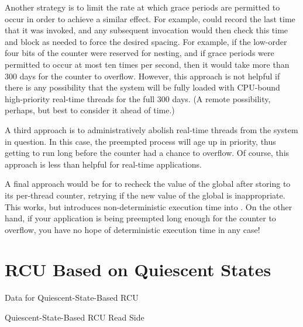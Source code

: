 {	Another strategy is to limit the rate at which grace periods are
	permitted to occur in order to achieve a similar effect.
	For example,  could record the last time
	that it was invoked, and any subsequent invocation would then
	check this time and block as needed to force the desired
	spacing.
	For example, if the low-order four bits of the counter were
	reserved for nesting, and if grace periods were permitted to
	occur at most ten times per second, then it would take more
	than 300 days for the counter to overflow.
	However, this approach is not helpful if there is any possibility
	that the system will be fully loaded with CPU-bound high-priority
	real-time threads for the full 300 days.
	(A remote possibility, perhaps, but best to consider it ahead
	of time.)

	A third approach is to administratively abolish real-time threads
	from the system in question.
	In this case, the preempted process will age up in priority,
	thus getting to run long before the counter had a chance to
	overflow.
	Of course, this approach is less than helpful for real-time
	applications.

	A final approach would be for  to recheck
	the value of the global  after storing to its
	per-thread  counter, retrying if the new
	value of the global  is inappropriate.
	This works, but introduces non-deterministic execution time
	into .
	On the other hand, if your application is being preempted long
	enough for the counter to overflow, you have no hope of
	deterministic execution time in any case!
} \QuickQuizEnd

\section{RCU Based on Quiescent States}
\label{sec:app:toyrcu:RCU Based on Quiescent States}

\begin{listing}[tbp]

\caption{Data for Quiescent-State-Based RCU}
\label{lst:app:toyrcu:Data for Quiescent-State-Based RCU}
\end{listing}

\begin{listing}[tbp]

\caption{Quiescent-State-Based RCU Read Side}
\label{lst:app:toyrcu:Quiescent-State-Based RCU Read Side}
\end{listing}

